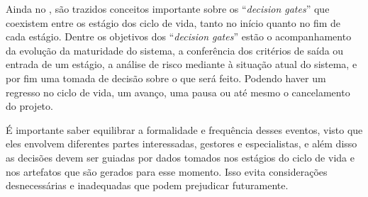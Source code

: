



	Ainda no \cite{incoseHandbook}, são trazidos conceitos importante sobre os ``\textit{decision gates}'' que coexistem entre os estágio dos ciclo de vida, tanto no início quanto no fim de cada estágio.
	Dentre os objetivos dos ``\textit{decision gates}'' estão o acompanhamento da evolução da maturidade do sistema, a conferência dos critérios de saída ou entrada de um estágio,
	a análise de risco mediante à situação atual do sistema, e por fim uma tomada de decisão sobre o que será feito. Podendo haver um regresso no ciclo de vida, um avanço, uma pausa 
	ou até mesmo o cancelamento do projeto.

	É importante saber equilibrar a formalidade e frequência desses eventos, visto que eles envolvem diferentes partes interessadas, gestores e especialistas, e além disso as
	decisões devem ser guiadas por dados tomados nos estágios do ciclo de vida e nos artefatos que são gerados para esse momento. Isso evita considerações desnecessárias e 
	inadequadas que podem prejudicar futuramente.

